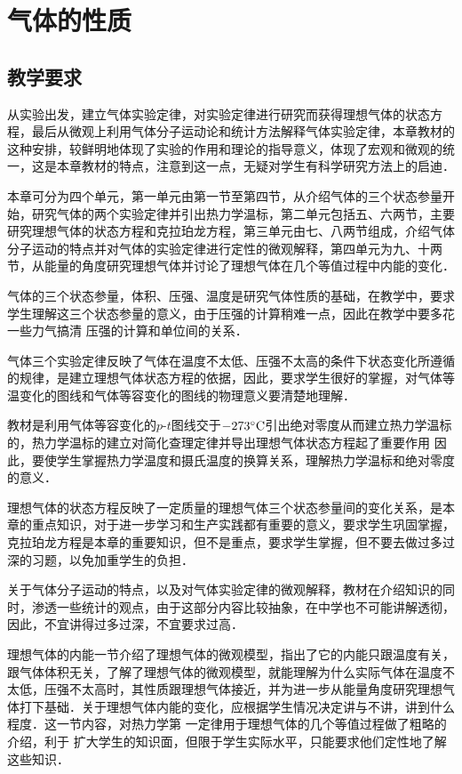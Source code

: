 
\chapter{气体的性质}\minitoc[n]
\section{教学要求}
从实验出发，建立气体实验定律，对实验定律进行研究而获得理想气体的状态方程，最后从微观上利用气体分子运动论和统计方法解释气体实验定律，本章教材的这种安排，较鲜明地体现了实验的作用和理论的指导意义，体现了宏观和微观的统一，这是本章教材的特点，注意到这一点，无疑对学生有科学研究方法上的启迪．

本章可分为四个单元，第一单元由第一节至第四节，从介绍气体的三个状态参量开始，研究气体的两个实验定律并引出热力学温标，第二单元包括五、六两节，主要研究理想气体的状态方程和克拉珀龙方程，第三单元由七、八两节组成，介绍气体分子运动的特点并对气体的实验定律进行定性的微观解释，第四单元为九、十两节，从能量的角度研究理想气体并讨论了理想气体在几个等值过程中内能的变化．

气体的三个状态参量，体积、压强、温度是研究气体性质的基础，在教学中，要求学生理解这三个状态参量的意义，由于压强的计算稍难一点，因此在教学中要多花一些力气搞清
压强的计算和单位间的关系．

气体三个实验定律反映了气体在温度不太低、压强不太高的条件下状态变化所遵循的规律，是建立理想气体状态方程的依据，因此，要求学生很好的掌握，对气体等温变化的图线和气体等容变化的图线的物理意义要清楚地理解．

教材是利用气体等容变化的$p$-$t$图线交于${\rm -273^{\circ}C}$引出绝对零度从而建立热力学温标的，热力学温标的建立对简化查理定律并导出理想气体状态方程起了重要作用 因此，要使学生掌握热力学温度和摄氏温度的换算关系，理解热力学温标和绝对零度的意义．

理想气体的状态方程反映了一定质量的理想气体三个状态参量间的变化关系，是本章的重点知识，对于进一步学习和生产实践都有重要的意义，要求学生巩固掌握，克拉珀龙方程是本章的重要知识，但不是重点，要求学生掌握，但不要去做过多过深的习题，以免加重学生的负担．

关于气体分子运动的特点，以及对气体实验定律的微观解释，教材在介绍知识的同时，渗透一些统计的观点，由于这部分内容比较抽象，在中学也不可能讲解透彻，因此，不宜讲得过多过深，不宜要求过高．

理想气体的内能一节介绍了理想气体的微观模型，指出了它的内能只跟温度有关，跟气体体积无关，了解了理想气体的微观模型，就能理解为什么实际气体在温度不太低，压强不太高时，其性质跟理想气体接近，并为进一步从能量角度研究理想气体打下基础．关于理想气体内能的变化，应根据学生情况决定讲与不讲，讲到什么程度．这一节内容，对热力学第
一定律用于理想气体的几个等值过程做了粗略的介绍，利于
扩大学生的知识面，但限于学生实际水平，只能要求他们定性地了解这些知识．

